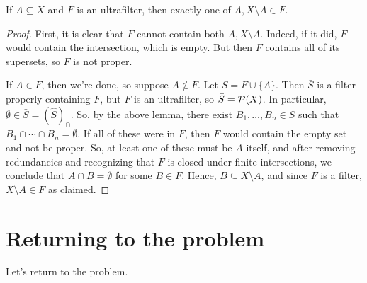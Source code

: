 \documentclass[12pt]{exam}
\begin{document}
\begin{lem} If $A \subseteq X$ and $F$ is an ultrafilter, then exactly one of $A,X \setminus A \in F$. \end{lem}
\begin{proof}
	First, it is clear that $F$ cannot contain both $A,X \setminus A$. Indeed, if it did, $F$ would contain the intersection, which is empty. But then $F$ contains all of its supersets, so $F$ is not proper.
	
	If $A \in F$, then we're done, so suppose $A \notin F$. Let $S = F \cup \{A\}$. Then $\bar{S}$ is a filter properly containing $F$, but $F$ is an ultrafilter, so $\bar{S} = \mathcal{P}(X)$. In particular, $\emptyset \in \bar{S} = (\hat{S})_{\cap}$. So, by the above lemma, there exist $B_1,\ldots,B_n \in S$ such that $B_1 \cap \cdots \cap B_n = \emptyset$. If all of these were in $F$, then $F$ would contain the empty set and not be proper. So, at least one of these must be $A$ itself, and after removing redundancies and recognizing that $F$ is closed under finite intersections, we conclude that $A \cap B = \emptyset$ for some $B \in F$. Hence, $B \subseteq X \setminus A$, and since $F$ is a filter, $X \setminus A \in F$ as claimed.
\end{proof}

\section*{Returning to the problem}

Let's return to the problem.
\end{document}
